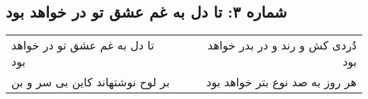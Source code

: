 \begin{center}
\section*{شماره ۳: تا دل به غم عشق تو در خواهد بود}
\label{sec:003}
\begin{longtable}{l p{0.5cm} r}
تا دل به غم عشق تو در خواهد بود
&&
دُردی کش و رند و در بدر خواهد بود
\\
بر لوح نوشتهاند کاین بی سر و بن
&&
هر روز به صد نوع بتر خواهد بود
\\
\end{longtable}
\end{center}
